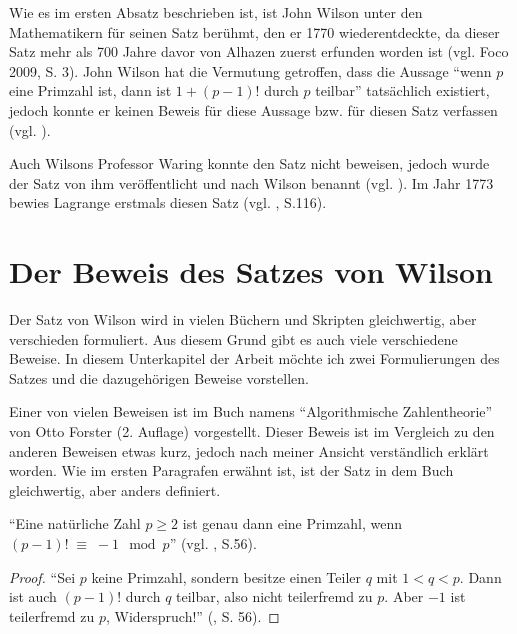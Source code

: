 Wie es im ersten Absatz beschrieben ist, ist John Wilson
unter den Mathematikern für seinen Satz berühmt, den er
1770 wiederentdeckte, da dieser Satz mehr als 700 Jahre
davor von Alhazen zuerst erfunden worden ist
(vgl. Foco 2009, S. 3). John Wilson hat die Vermutung
getroffen, dass die Aussage ``wenn $p$ eine Primzahl ist,
dann ist $1+(p-1)!$ durch $p$ teilbar'' tatsächlich
existiert, jedoch konnte er keinen Beweis für diese
Aussage bzw. für diesen Satz verfassen (vgl.
\cite{oconnor_wilson}).

Auch Wilsons Professor Waring konnte den Satz nicht
beweisen, jedoch wurde der Satz von ihm veröffentlicht
und nach Wilson benannt (vgl. \cite{oconnor_wilson}).
Im Jahr 1773 bewies Lagrange erstmals diesen Satz
(vgl. \cite{ziegenbalg}, S.116).


\section{Der Beweis des Satzes von Wilson}

Der Satz von Wilson wird in vielen Büchern und Skripten
gleichwertig, aber verschieden formuliert. Aus diesem
Grund gibt es auch viele verschiedene Beweise.
In diesem Unterkapitel der Arbeit möchte ich zwei
Formulierungen des Satzes und die dazugehörigen Beweise
vorstellen.

Einer von vielen Beweisen ist im Buch namens
``Algorithmische Zahlentheorie'' von Otto Forster
(2. Auflage) vorgestellt. Dieser Beweis ist im Vergleich
zu den anderen Beweisen etwas kurz, jedoch nach meiner
Ansicht verständlich erklärt worden. Wie im ersten 
Paragrafen erwähnt ist, ist der Satz in dem Buch
gleichwertig, aber anders definiert.

\begin{theorem}[Wilson]
``Eine natürliche Zahl $p \geq 2$ ist genau dann eine
Primzahl, wenn $(p-1)! \;\equiv\; -1 \mod p$''
(vgl. \cite{forster}, S.56).
\end{theorem}
\vspace{-.5cm}

\begin{proof}
 ``Sei $p$ keine Primzahl, sondern besitze einen Teiler
 $q$ mit $1 < q < p$. Dann ist auch $(p-1)!$ durch $q$
 teilbar, also nicht teilerfremd zu $p$. Aber $-1$ ist
 teilerfremd zu $p$, Widerspruch!'' (\cite{forster}, S. 56).
\end{proof}

